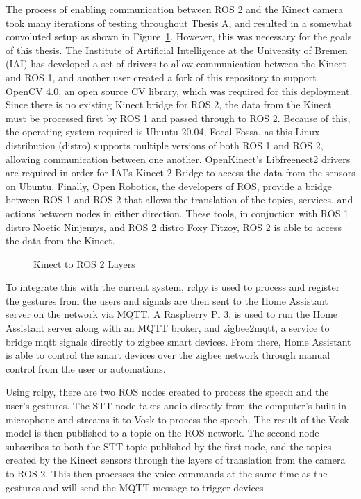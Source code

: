 The process of enabling communication between ROS 2 and the Kinect camera took many iterations of testing throughout Thesis A, and resulted in a somewhat convoluted setup as shown in Figure~\ref{fig:kinect_ros}.
However, this was necessary for the goals of this thesis.
The Institute of Artificial Intelligence at the University of Bremen (IAI) has developed a set of drivers to allow communication between the Kinect and ROS 1, and another user created a fork of this repository to support OpenCV 4.0, an open source CV library, which was required for this deployment.
Since there is no existing Kinect bridge for ROS 2, the data from the Kinect must be processed first by ROS 1 and passed through to ROS 2. Because of this, the operating system required is Ubuntu 20.04, Focal Fossa, as this Linux distribution (distro) supports multiple versions of both ROS 1 and ROS 2, allowing communication between one another.
OpenKinect's Libfreenect2 drivers are required in order for IAI's Kinect 2 Bridge to access the data from the sensors on Ubuntu.
Finally, Open Robotics, the developers of ROS, provide a bridge between ROS 1 and ROS 2 that allows the translation of the topics, services, and actions between nodes in either direction.
These tools, in conjuction with ROS 1 distro Noetic Ninjemys, and ROS 2 distro Foxy Fitzoy, ROS 2 is able to access the data from the Kinect.

\begin{figure}[!htb]
    \caption{Kinect to ROS 2 Layers}
    \label{fig:kinect_ros}
\end{figure}

To integrate this with the current system, rclpy is used to process and register the gestures from the users and signals are then sent to the Home Assistant server on the network via MQTT.
A Raspberry Pi 3, is used to run the Home Assistant server along with an MQTT broker, and zigbee2mqtt, a service to bridge mqtt signals directly to zigbee smart devices.
From there, Home Assistant is able to control the smart devices over the zigbee network through manual control from the user or automations.

Using rclpy, there are two ROS nodes created to process the speech and the user's gestures.
The STT node takes audio directly from the computer's built-in microphone and streams it to Vosk to process the speech.
The result of the Vosk model is then published to a topic on the ROS network.
The second node subscribes to both the STT topic published by the first node, and the topics created by the Kinect sensors through the layers of translation from the camera to ROS 2.
This then processes the voice commands at the same time as the gestures and will send the MQTT message to trigger devices.


